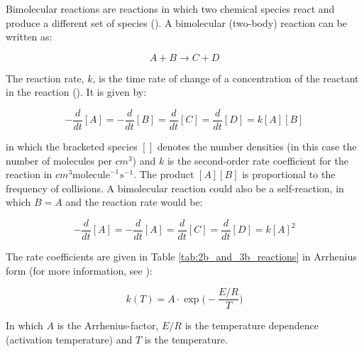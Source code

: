 Bimolecular reactions are reactions in which two chemical species react and produce a different set of species (\cite{Jacob1999}). A bimolecular (two-body) reaction can be written as: 

\begin{equation*}
    A + B \rightarrow C + D
\end{equation*}





The reaction rate, $k$, is the time rate of change of a concentration of the reactant in the reaction (\cite{AtmModFund}). It is given by: 

\begin{equation*}
    -\frac{d}{dt}[A] = -\frac{d}{dt}[B] = \frac{d}{dt}[C] = \frac{d}{dt}[D] = k[A][B]
\end{equation*}

in which the bracketed species $[]$ denotes the number densities (in this case the number of molecules per $cm^3$) and $k$ is the second-order rate coefficient for the reaction in $cm^3\text{molecule}^{-1}s^{-1}$. The product $[A][B]$ is proportional to the frequency of collisions. A bimolecular reaction could also be a self-reaction, in which $B = A$ and the reaction rate would be:

\begin{equation*}
    -\frac{d}{dt}[A] = -\frac{d}{dt}[A] = \frac{d}{dt}[C] = \frac{d}{dt}[D] = k[A]^2
\end{equation*}

The rate coefficients are given in Table \ref{tab:2b_and_3b_reactions} in Arrhenius form (for more information, see \cite{JPL}):

\begin{equation}
    k(T) = A\cdot\exp{\Big(-\frac{E/R}{T}\Big)}
    \label{eq:2b_rate_coeff}
\end{equation}

In which $A$ is the Arrhenius-factor, $E/R$ is the temperature dependence (activation temperature) and $T$ is the temperature. 

